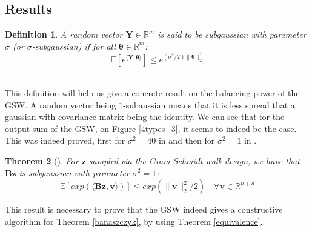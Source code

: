 \documentclass[12pt]{article}
\newtheorem{theorem}{Theorem}
\newtheorem{definition}[theorem]{Definition}
\begin{document}
\subsection{Results}\label{results}
\begin{definition}
A random vector $\textbf{Y} \in \mathbb{R}^m$ is said to be subgaussian with parameter $\sigma$ (or $\sigma$-subgaussian) if for all $\bm{\theta} \in \mathbb{R}^m$:
$$\mathbb{E}[e^{\langle\textbf{Y},\bm{\theta}\rangle}]\leq e^{(\sigma^2/2)\|\bm{\theta}\|_2^2}$$ \\
\end{definition}
This definition will help us give a concrete result on the balancing power of the GSW. A random vector being $1$-subaussian means that it is less spread that a gaussian with covariance matrix being the identity. We can see that for the output sum of the GSW, on Figure \ref{4types_3}, it seems to indeed be the case. This was indeed proved, first for $\sigma^2=40$ in \cite{blues} and then for $\sigma^2=1$ in \cite{harshaw2019balancing}.
\begin{theorem}[\cite{harshaw2019balancing}]
    For $\textbf{z}$ sampled via the Gram-Schmidt walk design, we have that $\textbf{Bz}$ is subgaussian with parameter $\sigma^2=1$:$$\mathbb{E}[exp(\langle\textbf{Bz},\textbf{v}\rangle)]\leq exp(\|\textbf{v}\|^2_2/2)\quad\forall\textbf{v}\in\mathbb{R}^{n+d}$$
\end{theorem}
This result is necessary to prove that the GSW indeed gives a constructive algorithm for Theorem \ref{banaszczyk}, by using Theorem \ref{equivalence}. 
\end{document}

